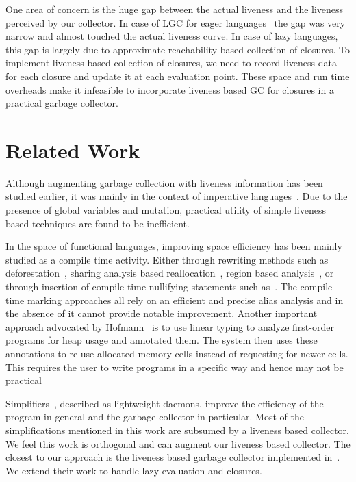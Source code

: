 \documentclass[preprint,9pt]{sigplanconf}
\begin{document}
One area of concern is  the huge gap between the actual
liveness and  the liveness perceived by  our collector.
In  case of  LGC for  eager languages~\cite{asati14lgc}
the gap was  very narrow and almost  touched the actual
liveness curve.  In case of lazy languages, this gap is
largely   due   to   approximate   reachability   based
collection  of closures.  To  implement liveness  based
collection of closures, we need to record liveness data
for  each  closure and  update  it  at each  evaluation
point.   These space  and  run time  overheads make  it
infeasible  to   incorporate  liveness  based   GC  for
closures in a practical garbage collector.


\section{Related Work} 
\label{sec:relatedwork}
Although  augmenting garbage  collection with  liveness
information has been studied  earlier, it was mainly in
the   context  of   imperative  languages~\cite{Albert,
  Hirzel,  khedker07heap}.   Due  to  the  presence  of
global  variables and  mutation,  practical utility  of
simple  liveness  based  techniques  are  found  to  be
inefficient.

In the  space of functional languages,  improving space
efficiency has  been mainly  studied as a  compile time
activity.   Either through  rewriting  methods such  as
deforestation~\cite{wadler88deforest,gill93ashort,chitil99deforest},
sharing                  analysis                 based
reallocation~\cite{jones89compile},     region    based
analysis~\cite{tofte98region}, or  through insertion of
compile     time     nullifying     statements     such
as~\cite{inoue88analysis,lee05static,Hamilton}.     The
compile  time   marking  approaches  all  rely   on  an
efficient and precise alias analysis and in the absence
of  it  cannot  provide  notable  improvement.  Another
important         approach         advocated         by
Hofmann~\cite{HofmannJ03}  is to  use linear  typing to
analyze  first-order   programs  for  heap   usage  and
annotated them. The system  then uses these annotations
to re-use allocated memory  cells instead of requesting
for  newer  cells.  This  requires the  user  to  write
programs  in  a  specific  way and  hence  may  not  be
practical

Simplifiers~\cite{ONeill},  described   as  lightweight
daemons,  improve  the  efficiency of  the  program  in
general and  the garbage collector in  particular. Most
of  the  simplifications  mentioned in  this  work  are
subsumed by  a liveness  based collector. We  feel this
work is  orthogonal and can augment  our liveness based
collector.  The closest to our approach is the liveness
based        garbage       collector        implemented
in~\cite{asati14lgc}.  We extend  their work  to handle
lazy evaluation and closures.
 
\end{document}
